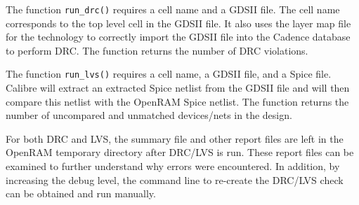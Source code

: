 The function \verb|run_drc()| requires a cell name and a GDSII
file. The cell name corresponds to the top level cell in the GDSII
file. It also uses the layer map file for the technology to correctly
import the GDSII file into the Cadence database to perform DRC. The
function returns the number of DRC violations. 

The function \verb|run_lvs()| requires a cell name, a GDSII file, and
a Spice file. Calibre will extract an extracted Spice netlist from the
GDSII file and will then compare this netlist with the OpenRAM Spice
netlist. The function returns the number of uncompared and unmatched
devices/nets in the design.

For both DRC and LVS, the summary file and other report files are left
in the OpenRAM temporary directory after DRC/LVS is run. These report
files can be examined to further understand why errors were
encountered. In addition, by increasing the debug level, the command
line to re-create the DRC/LVS check can be obtained and run manually.






